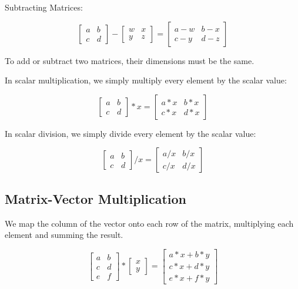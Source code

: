 \documentclass[UTF8]{article}
\begin{document}
Subtracting Matrices:

\[ \begin{bmatrix} a&b\\c&d \end{bmatrix} - \begin{bmatrix} w&x\\y&z \end{bmatrix} = \begin{bmatrix} a-w&b-x\\c-y&d-z \end{bmatrix}\]

To add or subtract two matrices, their dimensions must be the same.

In scalar multiplication, we simply multiply every element by the scalar value:

\[ \begin{bmatrix} a&b\\c&d \end{bmatrix} * x = \begin{bmatrix} a*x&b*x\\c*x&d*x \end{bmatrix}\]

In scalar division, we simply divide every element by the scalar value:

\[ \begin{bmatrix} a&b\\c&d \end{bmatrix} / x = \begin{bmatrix} a/x&b/x\\c/x&d/x \end{bmatrix}\]

\subsection{Matrix-Vector Multiplication}

We map the column of the vector onto each row of the matrix, multiplying each element and summing the result.

\[ \begin{bmatrix} a&b\\c&d\\e&f \end{bmatrix} * \begin{bmatrix} x\\y \end{bmatrix} = \begin{bmatrix} a*x+b*y\\c*x+d*y\\e*x+f*y \end{bmatrix}\]
\end{document}
